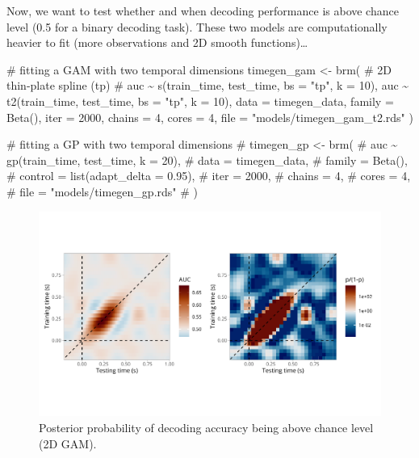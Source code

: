 \documentclass[
  doc,
  floatsintext,
  longtable,
  a4paper,
  nolmodern,
  notxfonts,
  notimes,
  colorlinks=true,linkcolor=blue,citecolor=blue,urlcolor=blue]{apa7}
\newenvironment{Shaded}{\begin{snugshade}}{\end{snugshade}}
\newcommand{\AttributeTok}[1]{\textcolor[rgb]{0.40,0.45,0.13}{#1}}
\newcommand{\CommentTok}[1]{\textcolor[rgb]{0.37,0.37,0.37}{#1}}
\newcommand{\DecValTok}[1]{\textcolor[rgb]{0.68,0.00,0.00}{#1}}
\newcommand{\FunctionTok}[1]{\textcolor[rgb]{0.28,0.35,0.67}{#1}}
\newcommand{\NormalTok}[1]{\textcolor[rgb]{0.00,0.23,0.31}{#1}}
\newcommand{\OtherTok}[1]{\textcolor[rgb]{0.00,0.23,0.31}{#1}}
\newcommand{\SpecialCharTok}[1]{\textcolor[rgb]{0.37,0.37,0.37}{#1}}
\newcommand{\StringTok}[1]{\textcolor[rgb]{0.13,0.47,0.30}{#1}}
\begin{document}
Now, we want to test whether and when decoding performance is above
chance level (0.5 for a binary decoding task). These two models are
computationally heavier to fit (more observations and 2D smooth
functions)\ldots{}

\begin{Shaded}
\begin{Highlighting}[]
\CommentTok{\# fitting a GAM with two temporal dimensions}
\NormalTok{timegen\_gam }\OtherTok{\textless{}{-}} \FunctionTok{brm}\NormalTok{(}
    \CommentTok{\# 2D thin{-}plate spline (tp)}
    \CommentTok{\# auc \textasciitilde{} s(train\_time, test\_time, bs = "tp", k = 10),}
\NormalTok{    auc }\SpecialCharTok{\textasciitilde{}} \FunctionTok{t2}\NormalTok{(train\_time, test\_time, }\AttributeTok{bs =} \StringTok{"tp"}\NormalTok{, }\AttributeTok{k =} \DecValTok{10}\NormalTok{),}
    \AttributeTok{data =}\NormalTok{ timegen\_data,}
    \AttributeTok{family =} \FunctionTok{Beta}\NormalTok{(),}
    \AttributeTok{iter =} \DecValTok{2000}\NormalTok{,}
    \AttributeTok{chains =} \DecValTok{4}\NormalTok{,}
    \AttributeTok{cores =} \DecValTok{4}\NormalTok{,}
    \AttributeTok{file =} \StringTok{"models/timegen\_gam\_t2.rds"}
\NormalTok{    )}

\CommentTok{\# fitting a GP with two temporal dimensions}
\CommentTok{\# timegen\_gp \textless{}{-} brm(}
\CommentTok{\#     auc \textasciitilde{} gp(train\_time, test\_time, k = 20),}
\CommentTok{\#     data = timegen\_data,}
\CommentTok{\#     family = Beta(),}
\CommentTok{\#     control = list(adapt\_delta = 0.95),}
\CommentTok{\#     iter = 2000,}
\CommentTok{\#     chains = 4,}
\CommentTok{\#     cores = 4,}
\CommentTok{\#     file = "models/timegen\_gp.rds"}
\CommentTok{\#     )}
\end{Highlighting}
\end{Shaded}

\begin{figure}[H]

\caption{Posterior probability of decoding accuracy being above chance
level (2D GAM).}

{\centering \includegraphics[width=1\textwidth,height=\textheight]{brms_meeg_files/figure-pdf/gam-timegen-post-preds-1.pdf}

}

\end{figure}%
\end{document}
